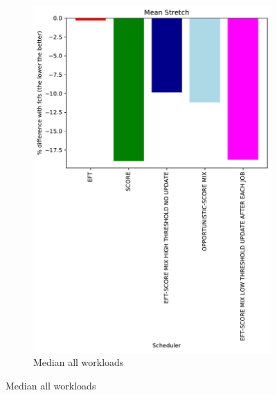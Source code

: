 \documentclass[a4paper]{article}
\begin{document}
\begin{figure}[H]
\begin{subfigure}[b]{0.4\linewidth}\centering\includegraphics[width=1\linewidth]{MBSS/plot/Results_Percentage_FCFS_All_workloads_mediane_Mean_Stretch_450_128_32_256_4_1024.pdf}\caption{Median all workloads}\end{subfigure}

\end{figure}
\end{document}
